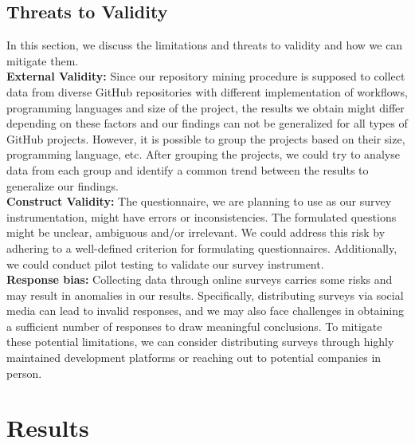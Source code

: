 \documentclass[conference]{IEEEtran}
\begin{document}
    \subsection{Threats to Validity}
        In this section, we discuss the limitations and threats to
        validity and how we can mitigate them.\\

        \textbf{External Validity:} Since our repository mining procedure is supposed to collect data from diverse GitHub repositories with different implementation of workflows, programming languages and size of the project, the results we obtain might differ depending on these factors and our findings can not be generalized for all types of GitHub projects. However, it is possible to group the projects based on their size, programming language, etc. After grouping the projects, we could try to analyse data from each group and identify a common trend between the results to generalize our findings.\\

	\textbf{Construct Validity:} The questionnaire, we are planning to use as our survey instrumentation, might have errors or inconsistencies. The formulated questions might be unclear, ambiguous and/or irrelevant. We could address this risk by adhering to a well-defined criterion for formulating questionnaires. Additionally, we could conduct pilot testing to validate our survey instrument.\\

        \textbf{Response bias:} Collecting data through online surveys carries some risks and may result in anomalies in our results. Specifically, distributing surveys via social media can lead to invalid responses, and we may also face challenges in obtaining a sufficient number of responses to draw meaningful conclusions. To mitigate these potential limitations, we can consider distributing surveys through highly maintained development platforms or reaching out to potential companies in person. 


\section{Results}
\end{document}
